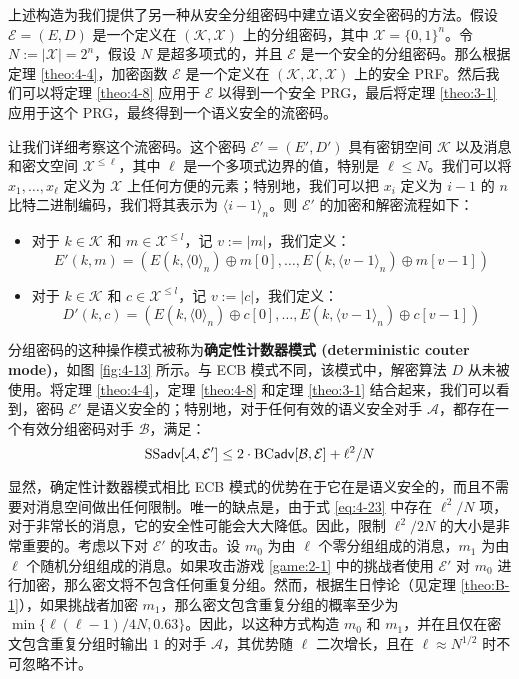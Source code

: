 上述构造为我们提供了另一种从安全分组密码中建立语义安全密码的方法。假设 $\mathcal{E}=(E,D)$ 是一个定义在 $(\mathcal{K},\mathcal{X})$ 上的分组密码，其中 $\mathcal{X}=\{0,1\}^n$。令 $N:=|\mathcal{X}|=2^n$，假设 $N$ 是超多项式的，并且 $\mathcal{E}$ 是一个安全的分组密码。那么根据定理 \ref{theo:4-4}，加密函数 $\mathcal{E}$ 是一个定义在 $(\mathcal{K},\mathcal{X},\mathcal{X})$ 上的安全 PRF。然后我们可以将定理 \ref{theo:4-8} 应用于 $\mathcal{E}$  以得到一个安全 PRG，最后将定理 \ref{theo:3-1} 应用于这个 PRG，最终得到一个语义安全的流密码。

让我们详细考察这个流密码。这个密码 $\mathcal{E}'=(E',D')$ 具有密钥空间 $\mathcal{K}$ 以及消息和密文空间 $\mathcal{X}^{\leq\ell}$，其中 $\ell$ 是一个多项式边界的值，特别是 $\ell\leq N$。我们可以将 $x_1,\dots,x_\ell$ 定义为 $\mathcal{X}$ 上任何方便的元素；特别地，我们可以把 $x_i$ 定义为 $i-1$ 的 $n$ 比特二进制编码，我们将其表示为 $\langle i-1\rangle_n$。则 $\mathcal{E}'$ 的加密和解密流程如下：
\begin{itemize}
	\item 对于 $k\in\mathcal{K}$ 和 $m\in\mathcal{X}^{\leq l}$，记 $v:=|m|$，我们定义：
	\[
	E'(k,m)=(E(k,\langle0\rangle_n)\oplus m[0],\dots,E(k,\langle v-1\rangle_n)\oplus m[v-1])
	\]
	\item 对于 $k\in\mathcal{K}$ 和 $c\in\mathcal{X}^{\leq l}$，记 $v:=|c|$，我们定义：
	\[
	D'(k,c)=(E(k,\langle0\rangle_n)\oplus c[0],\dots,E(k,\langle v-1\rangle_n)\oplus c[v-1])
	\]
\end{itemize}

分组密码的这种操作模式被称为\textbf{确定性计数器模式 (deterministic couter mode)}，如图 \ref{fig:4-13} 所示。与 ECB 模式不同，该模式中，解密算法 $D$ 从未被使用。将定理 \ref{theo:4-4}，定理 \ref{theo:4-8} 和定理 \ref{theo:3-1} 结合起来，我们可以看到，密码 $\mathcal{E}'$ 是语义安全的；特别地，对于任何有效的语义安全对手 $\mathcal{A}$，都存在一个有效分组密码对手 $\mathcal{B}$，满足：
\begin{equation}\label{eq:4-23}
{\rm SS\mathsf{adv}}[\mathcal{A},\mathcal{E}']\leq2\cdot{\rm BC\mathsf{adv}}[\mathcal{B},\mathcal{E}]+{\ell^2}/{N}
\end{equation}

显然，确定性计数器模式相比 ECB 模式的优势在于它在是语义安全的，而且不需要对消息空间做出任何限制。唯一的缺点是，由于式 \ref{eq:4-23} 中存在 ${\ell^2}/{N}$ 项，对于非常长的消息，它的安全性可能会大大降低。因此，限制 ${\ell^2}/{2N}$ 的大小是非常重要的。考虑以下对 $\mathcal{E}'$ 的攻击。设 $m_0$ 为由 $\ell$ 个零分组组成的消息，$m_1$ 为由 $\ell$ 个随机分组组成的消息。如果攻击游戏 \ref{game:2-1} 中的挑战者使用 $\mathcal{E}'$ 对 $m_0$ 进行加密，那么密文将不包含任何重复分组。然而，根据生日悖论（见定理 \ref{theo:B-1}），如果挑战者加密 $m_1$，那么密文包含重复分组的概率至少为 $\min\{{\ell(\ell-1)}/{4N},0.63\}$。因此，以这种方式构造 $m_0$ 和 $m_1$，并在且仅在密文包含重复分组时输出 $1$ 的对手 $\mathcal{A}$，其优势随 $\ell$ 二次增长，且在 $\ell\approx N^{1/2}$ 时不可忽略不计。

